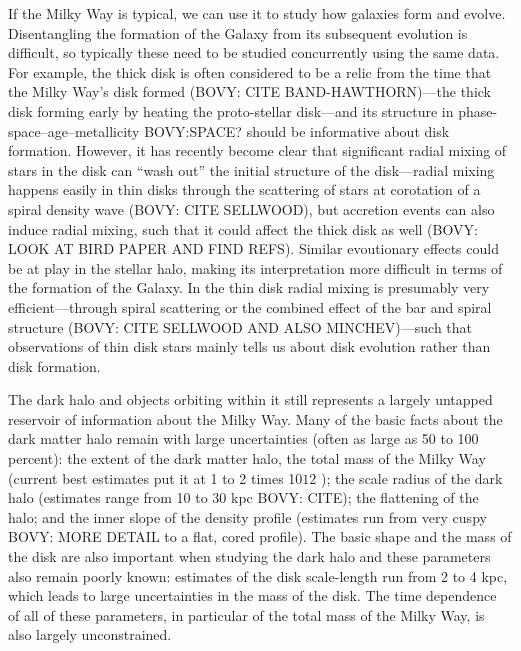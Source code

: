 If the Milky Way is typical, we can use it to study how galaxies form
and evolve. Disentangling the formation of the Galaxy from its
subsequent evolution is difficult, so typically these need to be
studied concurrently using the same data. For example, the thick disk
is often considered to be a relic from the time that the Milky Way's
disk formed (BOVY: CITE BAND-HAWTHORN)---the thick disk forming early
by heating the proto-stellar disk---and its structure in
phase-space--age--metallicity BOVY:SPACE? should be informative about
disk formation. However, it has recently become clear that significant
radial mixing of stars in the disk can ``wash out'' the initial
structure of the disk---radial mixing happens easily in thin disks
through the scattering of stars at corotation of a spiral density wave
(BOVY: CITE SELLWOOD), but accretion events can also induce radial
mixing, such that it could affect the thick disk as well (BOVY: LOOK
AT BIRD PAPER AND FIND REFS). Similar evoutionary effects could be at
play in the stellar halo, making its interpretation more difficult in
terms of the formation of the Galaxy. In the thin disk radial mixing
is presumably very efficient---through spiral scattering or the
combined effect of the bar and spiral structure (BOVY: CITE SELLWOOD
AND ALSO MINCHEV)---such that observations of thin disk stars mainly
tells us about disk evolution rather than disk formation.

The dark halo and objects orbiting within it still represents a
largely untapped reservoir of information about the Milky Way. Many of
the basic facts about the dark matter halo remain with large
uncertainties (often as large as 50 to 100\,percent): the extent of
the dark matter halo, the total mass of the Milky Way (current best
estimates put it at 1 to 2 times 10${12}$ \Msol); the scale radius of
the dark halo (estimates range from 10 to 30 kpc BOVY: CITE); the
flattening of the halo; and the inner slope of the density profile
(estimates run from very cuspy BOVY: MORE DETAIL to a flat, cored
profile). The basic shape and the mass of the disk are also important
when studying the dark halo and these parameters also remain poorly
known: estimates of the disk scale-length run from 2 to 4 kpc, which
leads to large uncertainties in the mass of the disk. The time
dependence of all of these parameters, in particular of the total mass
of the Milky Way, is also largely unconstrained.

